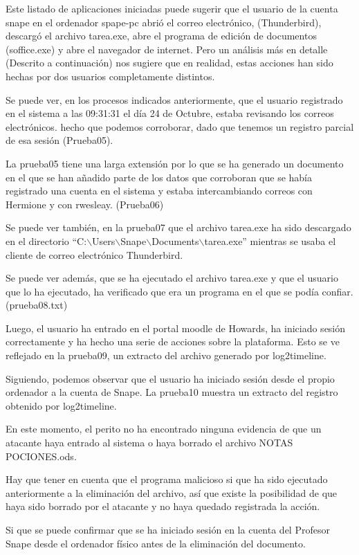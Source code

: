 Este listado de aplicaciones iniciadas puede sugerir que el usuario de la cuenta snape en el ordenador spape-pc abrió el correo electrónico, (Thunderbird), descargó el archivo tarea.exe, abre el programa de edición de documentos (soffice.exe) y abre el navegador de internet. Pero un análisis más en detalle (Descrito a continuación) nos sugiere que en realidad, estas acciones han sido hechas por dos usuarios completamente distintos.

Se puede ver, en los procesos indicados anteriormente, que el usuario registrado en el sistema a las 09:31:31 el día 24 de Octubre, estaba revisando los correos electrónicos.
hecho que podemos corroborar, dado que tenemos un registro parcial de esa sesión (Prueba05).

La prueba05 tiene una larga extensión por lo que se ha generado un documento en el que se han añadido parte de los datos que corroboran que se había registrado una cuenta en el sistema y estaba intercambiando correos con Hermione y con rwesleay. (Prueba06)

Se puede ver también, en la prueba07 que el archivo tarea.exe ha sido descargado en el directorio ``C:$\backslash$Users$\backslash$Snape$\backslash$Documents$\backslash$tarea.exe'' mientras se usaba el cliente de correo electrónico Thunderbird.

Se puede ver además, que se ha ejecutado el archivo tarea.exe y que el usuario que lo ha ejecutado, ha verificado que era un programa en el que se podía confiar. (prueba08.txt)

Luego, el usuario ha entrado en el portal moodle de Howards, ha iniciado sesión correctamente y ha hecho una serie de acciones sobre la plataforma. Esto se ve reflejado en la prueba09, un extracto del archivo generado por log2timeline.

Siguiendo, podemos observar que el usuario ha iniciado sesión desde el propio ordenador a la cuenta de Snape.
La prueba10 muestra un extracto del registro obtenido por log2timeline.

En este momento, el perito no ha encontrado ninguna evidencia de que un atacante haya entrado al sistema o haya borrado el archivo NOTAS POCIONES.ods.

Hay que tener en cuenta que el programa malicioso si que ha sido ejecutado anteriormente a la eliminación del archivo, así que existe la posibilidad de que haya sido borrado por el atacante y no haya quedado registrada la acción.

Si que se puede confirmar que se ha iniciado sesión en la cuenta del Profesor Snape desde el ordenador físico antes de la eliminación del documento.

